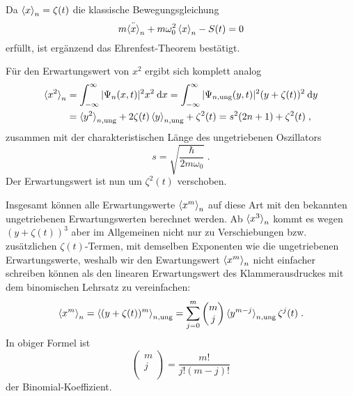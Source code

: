     Da $\braket{x}_n=\zeta(t)$ die klassische Bewegungsgleichung
    \begin{equation}
      m\ddot{\braket{x}}_n + m\omega_0^2\braket{x}_n - S(t) = 0
    \end{equation}
    erfüllt, ist ergänzend das Ehrenfest-Theorem bestätigt.

    Für den Erwartungswert von $x^2$ ergibt sich komplett analog
    \begin{align}
      \braket{x^2}_n &= \int_{-\infty}^{\infty} |\Psi_n(x,t)|^2 x^2 \: \text dx
      = \int_{-\infty}^{\infty} |\Psi_{n,\text{ung}}(y,t)|^2 (y+\zeta(t))^2 \: \text dy \notag \\
      &= \braket{y^2}_{n,\text{ung}} + 2\zeta(t)\braket{y}_{n,\text{ung}} + \zeta^2(t)
      = s^2(2n+1) + \zeta^2(t) \; ,
      \label{erwartungswert_x^2_einzelner}
    \end{align}
    zusammen mit der charakteristischen Länge des ungetriebenen Oszillators
    \begin{equation}
      s = \sqrt{\frac{\hbar}{2m\omega_0}} \; .
      \label{charak_laenge}
    \end{equation}
    Der Erwartungswert ist nun um $\zeta^2(t)$ verschoben.

    Insgesamt können alle Erwartungswerte $\braket{x^m}_n$ auf diese Art mit den bekannten ungetriebenen Erwartungswerten berechnet werden.
    Ab $\braket{x^3}_n$ kommt es wegen $(y+\zeta(t))^3$ aber im Allgemeinen nicht nur zu Verschiebungen bzw. zusätzlichen $\zeta(t)$-Termen, mit demselben Exponenten wie die ungetriebenen Erwartungswerte, weshalb wir den Ewartungswert $\braket{x^m}_n$ nicht einfacher schreiben können als den linearen Erwartungswert des Klammerausdruckes mit dem binomischen Lehrsatz zu vereinfachen:
    \begin{equation}
      \braket{x^m}_n = \braket{(y+\zeta(t))^m}_{n,\text{ung}} = \sum_{j=0}^m \begin{pmatrix} m \\ j \\ \end{pmatrix} \braket{y^{m-j}}_{n,\text{ung}}\zeta^j(t) \; .
      \label{erwartungswert_x^m_einzelner}
    \end{equation}
    In obiger Formel ist
    \begin{equation}
      \begin{pmatrix} m \\ j \\ \end{pmatrix} = \frac{m!}{j!(m-j)!}
    \end{equation}
    der Binomial-Koeffizient.

